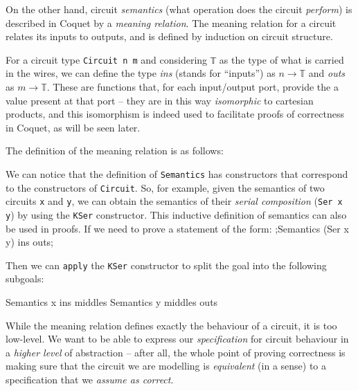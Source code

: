 \documentclass[a4paper]{article}
\begin{document}
                On the other hand, circuit \emph{semantics} (what operation does the circuit
                \emph{perform}) is described in Coquet by a \emph{meaning relation}. The meaning
                relation for a circuit relates its inputs to outputs, and is defined by induction on
                circuit structure.

                For a circuit type \texttt{Circuit n m} and considering \texttt{𝕋} as the type of
                what is carried in the wires, we can define the type \emph{ins} (stands for
                ``inputs'') as $n \rightarrow 𝕋$ and \emph{outs} as $m \rightarrow 𝕋$. These are
                functions that, for each input/output port, provide the a value present at that port
                -- they are in this way \emph{isomorphic} to cartesian products, and this isomorphism
                is indeed used to facilitate proofs of correctness in Coquet, as will be seen later.

                The definition of the meaning relation is as follows:


                We can notice that the definition of \texttt{Semantics} has constructors that
                correspond to the constructors of \texttt{Circuit}. So, for example, given the
                semantics of two circuits \texttt{x} and \texttt{y}, we can obtain the semantics of
                their \emph{serial composition} (\texttt{Ser x y}) by using the \texttt{KSer}
                constructor. This inductive definition of semantics can also be used in proofs. If
                we need to prove a statement of the form:
                \coq;Semantics (Ser x y) ins outs;

                Then we can \texttt{apply} the \texttt{KSer} constructor to split the goal into the
                following subgoals:

                \begin{coqcode}
        Semantics x ins middles
        Semantics y middles outs
                \end{coqcode}

                While the meaning relation defines exactly the behaviour of a circuit, it is too
                low-level. We want to be able to express our \emph{specification} for circuit
                behaviour in a \emph{higher level} of abstraction -- after all, the whole point of
                proving correctness is making sure that the circuit we are modelling is
                \emph{equivalent} (in a sense) to a specification that we \emph{assume as correct}.
\end{document}
